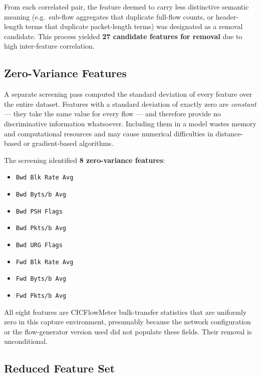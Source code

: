 From each correlated pair, the feature deemed to carry less distinctive semantic
meaning (e.g.\ sub-flow aggregates that duplicate full-flow counts, or
header-length terms that duplicate packet-length terms) was designated as a
removal candidate.  This process yielded \textbf{27 candidate features for
removal} due to high inter-feature correlation.

\subsection{Zero-Variance Features}
\label{sec:zero-variance}

A separate screening pass computed the standard deviation of every feature over
the entire dataset.  Features with a standard deviation of exactly zero are
\emph{constant} — they take the same value for every flow — and therefore
provide no discriminative information whatsoever.  Including them in a model
wastes memory and computational resources and may cause numerical difficulties
in distance-based or gradient-based algorithms.

The screening identified \textbf{8 zero-variance features}:

\begin{itemize}
  \item \texttt{Bwd Blk Rate Avg}
  \item \texttt{Bwd Byts/b Avg}
  \item \texttt{Bwd PSH Flags}
  \item \texttt{Bwd Pkts/b Avg}
  \item \texttt{Bwd URG Flags}
  \item \texttt{Fwd Blk Rate Avg}
  \item \texttt{Fwd Byts/b Avg}
  \item \texttt{Fwd Pkts/b Avg}
\end{itemize}

All eight features are CICFlowMeter bulk-transfer statistics that are uniformly
zero in this capture environment, presumably because the network configuration
or the flow-generator version used did not populate these fields.  Their removal
is unconditional.

\subsection{Reduced Feature Set}
\label{sec:reduced-feature-set}

